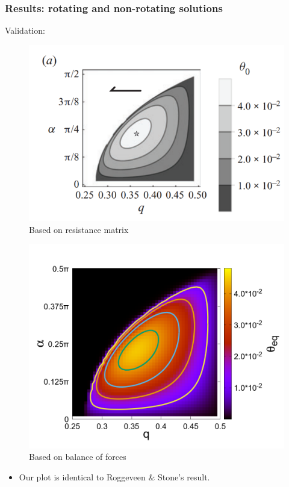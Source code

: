 \documentclass{beamer}
\newcommand{\bi}{\begin{itemize}}
\newcommand{\ei}{\end{itemize}}
\begin{document}
\begin{frame}
	\frametitle{Results: rotating and non-rotating solutions}
	\begin{overlayarea}{\textwidth}{\textheight}
		
	Validation: 
		\begin{figure}
		\begin{minipage}{0.52\linewidth}
			\footnotesize 
			\centering			\includegraphics[width=\linewidth]{plots/plot10.png}
			\footnotesize Based on resistance matrix 
		\end{minipage}
		\begin{minipage}{0.45\linewidth}
			\centering
			\includegraphics[width=\linewidth]{plots/numercial_straight_contour_theta_for_bamc.png}
			\footnotesize Based on balance of forces  
		\end{minipage}
	\end{figure}

\bi 
\item Our plot is identical to Roggeveen $\&$ Stone's result.
\ei 
	\end{overlayarea}
\end{frame}
\end{document}
